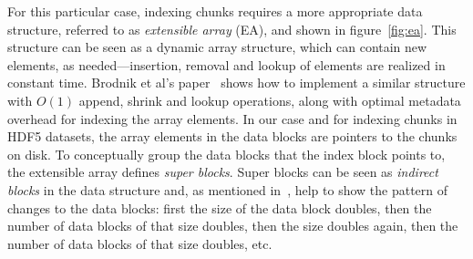 \begin{figure*}
\centering

\caption{Simplified version of extensible array structure used for indexing chunks.}
\label{fig:ea}
\end{figure*}

For this particular case, indexing chunks requires a more appropriate data
structure, referred to as \textit{extensible array} (EA), and shown in
figure~\ref{fig:ea}. This structure can be seen as a dynamic array structure,
which can contain new elements, as needed---insertion, removal and lookup of
elements are realized in constant time.
Brodnik et al's paper~\cite{Brodnik1999} shows how to implement a similar
structure with $O(1)$ append, shrink and lookup
operations, along with optimal metadata overhead for indexing the array elements.
In our case and for indexing chunks in HDF5 datasets, the array elements in the
data blocks are pointers to the chunks on disk.
To conceptually group the data blocks that the index block points to,
the extensible array defines \textit{super blocks}.
Super blocks can be seen as \textit{indirect blocks} in the data structure and,
as mentioned in~\cite{Brodnik1999}, help to show the pattern of
changes to the data blocks: first the size of the data block doubles, then the 
number of data blocks of that size doubles, then the size doubles again, then the 
number of data blocks of that size doubles, etc.

